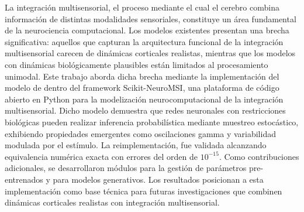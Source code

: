 La integración multisensorial, el proceso mediante el cual el cerebro combina información de distintas modalidades sensoriales, constituye un área fundamental de la neurociencia computacional. Los modelos existentes presentan una brecha significativa: aquellos que capturan la arquitectura funcional de la integración multisensorial carecen de dinámicas corticales realistas, mientras que los modelos con dinámicas biológicamente plausibles están limitados al procesamiento unimodal. Este trabajo aborda dicha brecha mediante la implementación del modelo de \citet{echeveste2020cortical} dentro del framework Scikit-NeuroMSI, una plataforma de código abierto en Python para la modelización neurocomputacional de la integración multisensorial. Dicho modelo demuestra que redes neuronales con restricciones biológicas pueden realizar inferencia probabilística mediante muestreo estocástico, exhibiendo propiedades emergentes como oscilaciones gamma y variabilidad modulada por el estímulo. La reimplementación, fue validada alcanzando equivalencia numérica exacta con errores del orden de $10^{-15}$. Como contribuciones adicionales, se desarrollaron módulos para la gestión de parámetros pre-entrenados y para modelos generativos. Los resultados posicionan a esta implementación como base técnica para futuras investigaciones que combinen dinámicas corticales realistas con integración multisensorial.